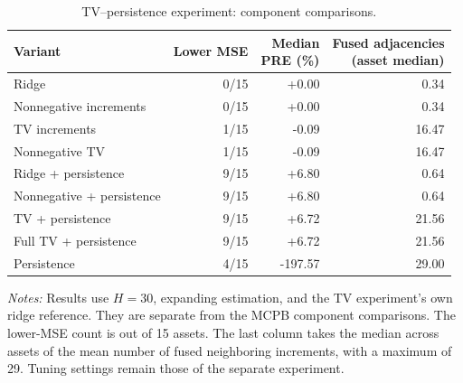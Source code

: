 \begin{table}[tbp]
\centering\small
\setlength{\tabcolsep}{4pt}
\renewcommand{\arraystretch}{1.12}
\caption{TV--persistence experiment: component comparisons.}
\label{tab:legacy_ablation}
\begin{tabular}{lrrr}
\toprule
Variant & Lower MSE & \shortstack{Median\\PRE (\%)} & \shortstack{Fused adjacencies\\(asset median)} \\
\midrule
Ridge & 0/15 & +0.00 & 0.34 \\
Nonnegative increments & 0/15 & +0.00 & 0.34 \\
TV increments & 1/15 & -0.09 & 16.47 \\
Nonnegative TV & 1/15 & -0.09 & 16.47 \\
Ridge + persistence & 9/15 & +6.80 & 0.64 \\
Nonnegative + persistence & 9/15 & +6.80 & 0.64 \\
TV + persistence & 9/15 & +6.72 & 21.56 \\
Full TV + persistence & 9/15 & +6.72 & 21.56 \\
Persistence & 4/15 & -197.57 & 29.00 \\
\bottomrule
\end{tabular}
\par\smallskip
\begin{minipage}{0.98\linewidth}\footnotesize
\textit{Notes:} Results use $H=30$, expanding estimation, and the TV experiment's own ridge reference. They are separate from the MCPB component comparisons. The lower-MSE count is out of 15 assets. The last column takes the median across assets of the mean number of fused neighboring increments, with a maximum of 29. Tuning settings remain those of the separate experiment.
\end{minipage}
\end{table}
